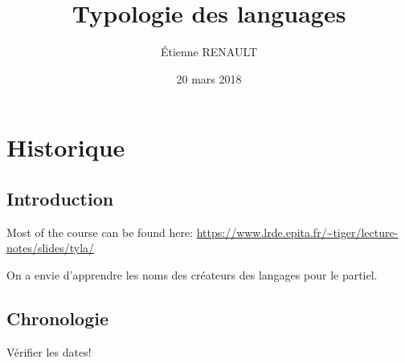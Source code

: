 \documentclass[a4paper,11pt]{article}
\title{Typologie des languages}
\author{Étienne RENAULT}
\date{20 mars 2018}
\begin{document}
\maketitle
\tableofcontents
\newpage

\section{Historique}

\subsection{Introduction}

Most of the course can be found here:
\url{https://www.lrde.epita.fr/~tiger/lecture-notes/slides/tyla/}

On a envie d'apprendre les noms des créateurs des langages pour le partiel.

\subsection{Chronologie}

Vérifier les dates!
\end{document}
